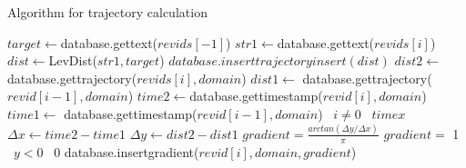 \documentclass[t]{beamer}
\newcommand{\LineIf}[3]{ {#1}
   \algorithmicif\ {#2}
   \algorithmicelse\ {#3} } %
\begin{document}
  \begin{frame}{Algorithm for trajectory calculation}
      \begin{algorithmic}
        \tiny
        \State $target \gets $database.gettext($revids[-1]$)
        \State $str1 \gets $database.gettext($revids[i]$)
        \State $dist \gets $LevDist($str1, target$)
        \State $database.inserttrajectoryinsert(dist)$    
        \EndIf
        \EndFor
        \State $dist2 \gets $database.gettrajectory($revids[i],domain$)
        \State $dist1 \gets$ database.gettrajectory($revid[i-1],domain$)
        \State $time2 \gets $database.gettimestamp($revid[i],domain$)
        \State $time1 \gets $
        \LineIf{database.gettimestamp($revid[i-1],domain$)}{$i \neq 0$}{$timex$} 
        \State ${\Delta}x \gets time2 - time1$
        \State ${\Delta}y \gets dist2 - dist1$
        \State $gradient = \frac{arctan({\Delta}y/{\Delta}x)}{\pi}$ 
        \State $gradient = $\LineIf{1}{$y < 0$}{0}
        \EndIf
        \State database.insertgradient($revid[i],domain,gradient$)
        \EndFor
        \EndProcedure
      \end{algorithmic}
  \end{frame}
\end{document}
